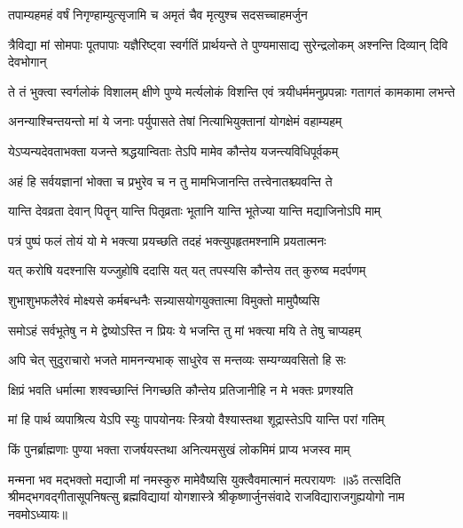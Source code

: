\twolineshloka
{तपाम्यहमहं वर्षं निगृण्हाम्युत्सृजामि च}
{अमृतं चैव मृत्युश्च सदसच्चाहमर्जुन}%

\fourlineindentedshloka
{त्रैविद्या मां सोमपाः पूतपापाः}
{यज्ञैरिष्ट्वा स्वर्गतिं प्रार्थयन्ते}
{ते पुण्यमासाद्य सुरेन्द्रलोकम्}
{अश्नन्ति दिव्यान् दिवि देवभोगान्}%

\fourlineindentedshloka
{ते तं भुक्त्वा स्वर्गलोकं विशालम्}
{क्षीणे पुण्ये मर्त्यलोकं विशन्ति}
{एवं त्रयीधर्ममनुप्रपन्नाः}
{गतागतं कामकामा लभन्ते}%

\twolineshloka
{अनन्याश्चिन्तयन्तो मां ये जनाः पर्युपासते}
{तेषां नित्याभियुक्तानां योगक्षेमं वहाम्यहम्}%

\twolineshloka
{येऽप्यन्यदेवताभक्ता यजन्ते श्रद्धयान्विताः}
{तेऽपि मामेव कौन्तेय यजन्त्यविधिपूर्वकम्}%

\twolineshloka
{अहं हि सर्वयज्ञानां भोक्ता च प्रभुरेव च}
{न तु मामभिजानन्ति तत्त्वेनातश्च्यवन्ति ते}%

\twolineshloka
{यान्ति देवव्रता देवान् पितॄन् यान्ति पितृव्रताः}
{भूतानि यान्ति भूतेज्या यान्ति मद्याजिनोऽपि माम्}%

\twolineshloka
{पत्रं पुष्पं फलं तोयं यो मे भक्त्या प्रयच्छति}
{तदहं भक्त्युपहृतमश्नामि प्रयतात्मनः}%

\twolineshloka
{यत् करोषि यदश्नासि यज्जुहोषि ददासि यत्}
{यत् तपस्यसि कौन्तेय तत् कुरुष्व मदर्पणम्}%

\twolineshloka
{शुभाशुभफलैरेवं मोक्ष्यसे कर्मबन्धनैः}
{सन्न्यासयोगयुक्तात्मा विमुक्तो मामुपैष्यसि}%

\twolineshloka
{समोऽहं सर्वभूतेषु न मे द्वेष्योऽस्ति न प्रियः}
{ये भजन्ति तु मां भक्त्या मयि ते तेषु चाप्यहम्}%

\twolineshloka
{अपि चेत् सुदुराचारो भजते मामनन्यभाक्}
{साधुरेव स मन्तव्यः सम्यग्व्यवसितो हि सः}%

\twolineshloka
{क्षिप्रं भवति धर्मात्मा शश्वच्छान्तिं निगच्छति}
{कौन्तेय प्रतिजानीहि न मे भक्तः प्रणश्यति}%

\twolineshloka
{मां हि पार्थ व्यपाश्रित्य येऽपि स्युः पापयोनयः}
{स्त्रियो वैश्यास्तथा शूद्रास्तेऽपि यान्ति परां गतिम्}%

\twolineshloka
{किं पुनर्ब्राह्मणाः पुण्या भक्ता राजर्षयस्तथा}
{अनित्यमसुखं लोकमिमं प्राप्य भजस्व माम्}%

\twolineshloka
{मन्मना भव मद्भक्तो मद्याजी मां नमस्कुरु}
{मामेवैष्यसि युक्त्वैवमात्मानं मत्परायणः}%
{॥ॐ तत्सदिति श्रीमद्भगवद्गीतासूपनिषत्सु ब्रह्मविद्यायां योगशास्त्रे श्रीकृष्णार्जुनसंवादे राजविद्याराजगुह्ययोगो नाम नवमोऽध्यायः॥}